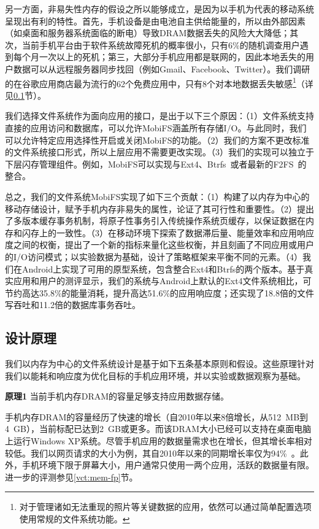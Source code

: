 另一方面，非易失性内存的假设之所以能够成立，是因为以手机为代表的移动系统呈现出有利的特性。首先，手机设备是由电池自主供给能量的，所以由外部因素（如桌面和服务器系统面临的断电）导致DRAM数据丢失的风险大大降低；其次，当前手机平台由于软件系统故障死机的概率很小，只有6\%的随机调查用户遇到每个月一次以上的死机；第三，大部分手机应用都是联网的，因此本地丢失的用户数据可以从远程服务器同步找回（例如Gmail、Facebook、Twitter）。我们调研的在谷歌应用商店最为流行的62个免费应用中，只有8个对本地数据丢失敏感\footnote{对于管理诸如无法重现的照片等关键数据的应用，依然可以通过简单配置选项使用常规的文件系统功能。}（详见\ref{vct:insight}节）。

我们选择文件系统作为面向应用的接口，是出于以下三个原因：（1）文件系统支持直接的应用访问和数据库，可以允许MobiFS涵盖所有存储I/O。与此同时，我们可以允许特定应用选择性开启或关闭MobiFS的功能。（2）我们的方案不更改标准的文件系统接口形式，所以上层应用不需要更改实现。（3）我们的实现可以独立于下层闪存管理组件。例如，MobiFS可以实现与Ext4、Btrfs~\cite{Rodeh:2013:BLB:2501620.2501623}或者最新的F2FS~\cite{188454}的整合。

总之，我们的文件系统MobiFS实现了如下三个贡献：（1）构建了以内存为中心的移动存储设计，赋予手机内存非易失的属性，论证了其可行性和重要性。（2）提出了多版本缓存事务机制，将原子性事务引入传统操作系统页缓存，以保证数据在内存和闪存上的一致性。（3）在移动环境下探索了数据滞后量、能量效率和应用响应度之间的权衡，提出了一个新的指标来量化这些权衡，并且刻画了不同应用或用户的I/O访问模式；以实验数据为基础，设计了策略框架来平衡不同的元素。（4）我们在Android上实现了可用的原型系统，包含整合Ext4和Btrfs的两个版本。基于真实应用和用户的测评显示，我们的系统与Android上默认的Ext4文件系统相比，可节约高达35.8\%的能量消耗，提升高达51.6\%的应用响应度；还实现了18.8倍的文件写吞吐和11.2倍的数据库事务吞吐。

\subsection{设计原理}
\label{vct:insight}

我们以内存为中心的文件系统设计是基于如下五条基本原则和假设。这些原理针对我们以能耗和响应度为优化目标的手机应用环境，并以实验或数据观察为基础。

\textbf{原理1} 当前手机内存DRAM的容量足够支持应用数据存储。

手机内存DRAM的容量经历了快速的增长（自2010年以来8倍增长，从512~MB到4~GB），当前标配已达到2~GB或更多。而该DRAM大小已经可以支持在桌面电脑上运行Windows XP系统。尽管手机应用的数据量需求也在增长，但其增长率相对较低。我们以网页请求的大小为例，其自2010年以来的同期增长率仅为94\%~\cite{HTTP:Transfer:2013}。此外，手机环境下限于屏幕大小，用户通常只使用一两个应用，活跃的数据量有限。进一步的评测参见\ref{vct:mem-fp}节。

